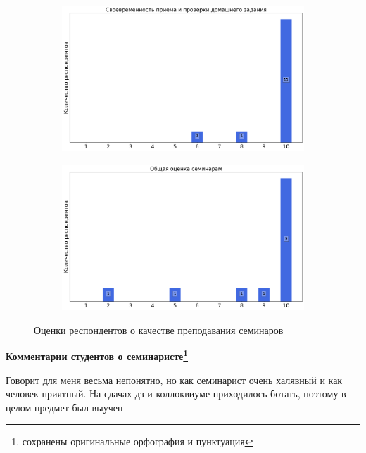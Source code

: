 \begin{figure}[H]
\begin{subfigure}[b]{0.45\textwidth}
                    \centering
                    \includegraphics[width=\textwidth]{images/3 course/Общая физика - квантовая физика/seminarists-marks-Стожков В.Ю.-2.png}
                \end{subfigure}
                \begin{subfigure}[b]{0.45\textwidth}
                    \centering
                    \includegraphics[width=\textwidth]{images/3 course/Общая физика - квантовая физика/seminarists-marks-Стожков В.Ю.-3.png}
                \end{subfigure}	
                \caption{Оценки респондентов о качестве преподавания семинаров}
            \end{figure}

            \textbf{Комментарии студентов о семинаристе\protect\footnote{сохранены оригинальные орфография и пунктуация}}
                \begin{commentbox} 
                    Говорит для меня весьма непонятно, но как семинарист очень халявный и как человек приятный. На сдачах дз и коллоквиуме приходилось ботать, поэтому в целом предмет был выучен 
                \end{commentbox} 

